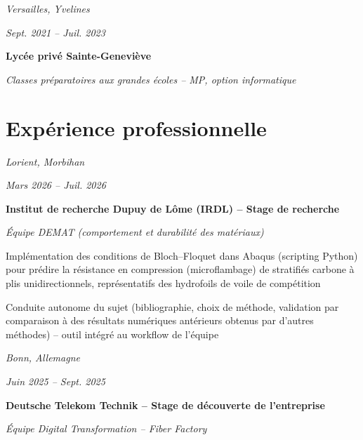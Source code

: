 \documentclass[10pt]{article}
\begin{document}
    \entrysep

    \begin{twocolentry}{
    \textit{Versailles, Yvelines}

    \textit{Sept. 2021 – Juil. 2023}}
        \textbf{Lycée privé Sainte-Geneviève}

        \textit{Classes préparatoires aux grandes écoles -- MP, option informatique}
    \end{twocolentry}


\section{Expérience professionnelle}

    \begin{twocolentry}{
    \textit{Lorient, Morbihan}

    \textit{Mars 2026 – Juil. 2026}}
        \textbf{Institut de recherche Dupuy de Lôme (IRDL) -- Stage de recherche}

        \textit{Équipe DEMAT (comportement et durabilité des matériaux)}
    \end{twocolentry}

    \bulletsep
    \begin{onecolentry}
        \begin{highlights}
            \item Implémentation des conditions de Bloch--Floquet dans Abaqus (scripting Python) pour prédire la résistance en compression (microflambage) de stratifiés carbone à plis unidirectionnels, représentatifs des hydrofoils de voile de compétition
            \item Conduite autonome du sujet (bibliographie, choix de méthode, validation par comparaison à des résultats numériques antérieurs obtenus par d'autres méthodes) -- outil intégré au workflow de l'équipe
        \end{highlights}
    \end{onecolentry}

    \entrysep

    \begin{twocolentry}{
    \textit{Bonn, Allemagne}

    \textit{Juin 2025 – Sept. 2025}}
        \textbf{Deutsche Telekom Technik -- Stage de découverte de l'entreprise}

        \textit{Équipe Digital Transformation -- Fiber Factory}
    \end{twocolentry}
\end{document}
